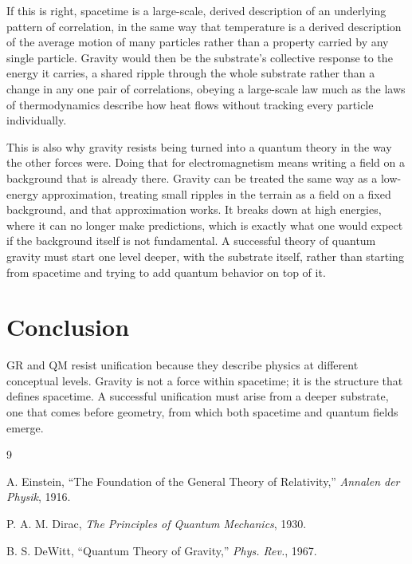 \documentclass[12pt]{article}
\begin{document}
If this is right, spacetime is a large-scale, derived description of an underlying pattern of correlation, in the same way that temperature is a derived description of the average motion of many particles rather than a property carried by any single particle. Gravity would then be the substrate's collective response to the energy it carries, a shared ripple through the whole substrate rather than a change in any one pair of correlations, obeying a large-scale law much as the laws of thermodynamics describe how heat flows without tracking every particle individually.

This is also why gravity resists being turned into a quantum theory in the way the other forces were. Doing that for electromagnetism means writing a field on a background that is already there. Gravity can be treated the same way as a low-energy approximation, treating small ripples in the terrain as a field on a fixed background, and that approximation works. It breaks down at high energies, where it can no longer make predictions, which is exactly what one would expect if the background itself is not fundamental. A successful theory of quantum gravity must start one level deeper, with the substrate itself, rather than starting from spacetime and trying to add quantum behavior on top of it.

\section{Conclusion}

GR and QM resist unification because they describe physics at different conceptual levels. Gravity is not a force within spacetime; it is the structure that defines spacetime. A successful unification must arise from a deeper substrate, one that comes before geometry, from which both spacetime and quantum fields emerge.

\begin{thebibliography}{9}

A. Einstein, ``The Foundation of the General Theory of Relativity,'' \emph{Annalen der Physik}, 1916.

P. A. M. Dirac, \emph{The Principles of Quantum Mechanics}, 1930.

B. S. DeWitt, ``Quantum Theory of Gravity,'' \emph{Phys. Rev.}, 1967.

\end{thebibliography}
\end{document}

